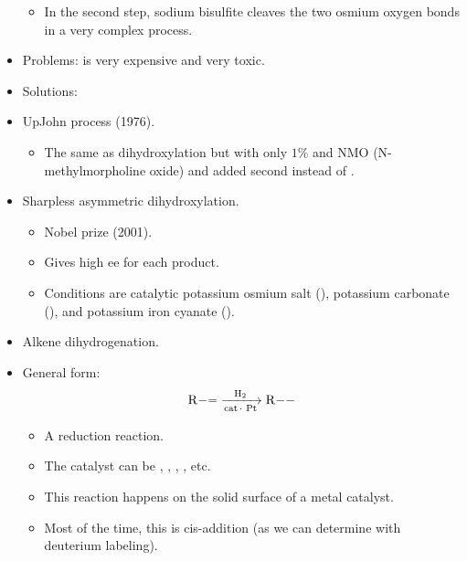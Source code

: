 \documentclass[../notes.tex]{subfiles}
\begin{document}
\begin{itemize}
\begin{itemize}
        \item In the second step, sodium bisulfite cleaves the two osmium oxygen bonds in a very complex process.
    \end{itemize}
    \item Problems:  is very expensive and very toxic.
    \item Solutions:
    \item UpJohn process (1976).
    \begin{itemize}
        \item The same as dihydroxylation but with only $1\%$  and NMO (N-methylmorpholine oxide) and  added second instead of .
    \end{itemize}
    \item Sharpless asymmetric dihydroxylation.
    \begin{itemize}
        \item Nobel prize (2001).
        \item Gives high ee for each product.
        \item Conditions are catalytic potassium osmium salt (), potassium carbonate (), and potassium iron cyanate ().
    \end{itemize}
    \item Alkene dihydrogenation.
    \item {}General form:
    \begin{equation*}
        \ce{R-= ->[H2][cat. Pt] R--}
    \end{equation*}
    \begin{itemize}
        \item A reduction reaction.
        \item The catalyst can be , , , , etc.
        \item This reaction happens on the solid surface of a metal catalyst.
        \item Most of the time, this is cis-addition (as we can determine with deuterium labeling).
    \end{itemize}
\end{itemize}
\end{document}
